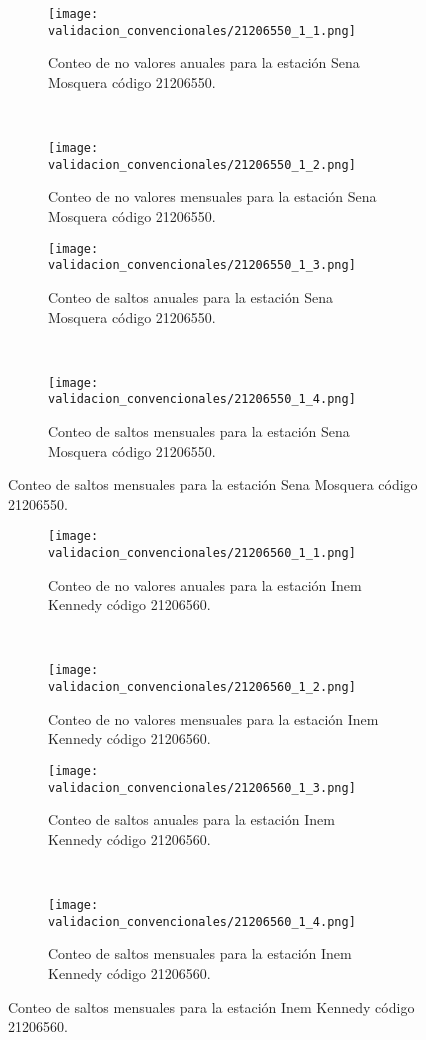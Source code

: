 \begin{figure}[H]\ContinuedFloat
\centering
	\begin{subfigure}[normla]{0.4\textwidth}
	\texttt{[image: validacion\_convencionales/21206550\_1\_1.png]}
		\caption{Conteo de no valores anuales para la estación Sena Mosquera código 21206550.}
		\label{subfig:a1}
		\end{subfigure}
		~
    \begin{subfigure}[normla]{0.4\textwidth}
	\texttt{[image: validacion\_convencionales/21206550\_1\_2.png]}
		\caption{Conteo de no valores mensuales para la estación Sena Mosquera código 21206550.}
		\label{subfig:a2}
		\end{subfigure}
		
    \begin{subfigure}[normla]{0.4\textwidth}
	\texttt{[image: validacion\_convencionales/21206550\_1\_3.png]}
		\caption{Conteo de saltos anuales para la estación Sena Mosquera código 21206550.}
		\label{subfig:a1}
		\end{subfigure}
		~
    \begin{subfigure}[normla]{0.4\textwidth}
	\texttt{[image: validacion\_convencionales/21206550\_1\_4.png]}
		\caption{Conteo de saltos mensuales para la estación Sena Mosquera código 21206550.}
		\label{subfig:a2}
		\end{subfigure}

	
\end{figure}
           
\begin{figure}[H]\ContinuedFloat
\centering
	\begin{subfigure}[normla]{0.4\textwidth}
	\texttt{[image: validacion\_convencionales/21206560\_1\_1.png]}
		\caption{Conteo de no valores anuales para la estación Inem Kennedy código 21206560.}
		\label{subfig:a1}
		\end{subfigure}
		~
    \begin{subfigure}[normla]{0.4\textwidth}
	\texttt{[image: validacion\_convencionales/21206560\_1\_2.png]}
		\caption{Conteo de no valores mensuales para la estación Inem Kennedy código 21206560.}
		\label{subfig:a2}
		\end{subfigure}
		
    \begin{subfigure}[normla]{0.4\textwidth}
	\texttt{[image: validacion\_convencionales/21206560\_1\_3.png]}
		\caption{Conteo de saltos anuales para la estación Inem Kennedy código 21206560.}
		\label{subfig:a1}
		\end{subfigure}
		~
    \begin{subfigure}[normla]{0.4\textwidth}
	\texttt{[image: validacion\_convencionales/21206560\_1\_4.png]}
		\caption{Conteo de saltos mensuales para la estación Inem Kennedy código 21206560.}
		\label{subfig:a2}
		\end{subfigure}

	
\end{figure}
           

